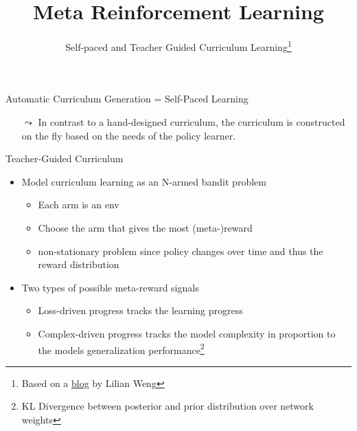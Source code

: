 


\title[Meta-RL]{Meta Reinforcement Learning}
\subtitle{Self-paced and Teacher Guided Curriculum Learning\footnote{Based on a \href{https://lilianweng.github.io/lil-log/2020/01/29/curriculum-for-reinforcement-learning.html}{blog} by Lilian Weng}}



	
	\maketitle

\begin{frame}[c]{Automatic Curriculum Generation = Self-Paced Learning}
	
	\begin{itemize}
		\item[$\leadsto$] In contrast to a hand-designed curriculum, the curriculum is constructed on the fly based on the needs of the policy learner.
	\end{itemize}
	
\end{frame}
\begin{frame}[c]{Teacher-Guided Curriculum }
	
	\begin{itemize}
		\item Model curriculum learning as an N-armed bandit problem
		\begin{itemize}
			\item Each arm is an env 
			\item Choose the arm that gives the most (meta-)reward
			\item non-stationary problem since policy changes over time and thus the reward distribution
		\end{itemize}
		\smallskip
		\item Two types of possible meta-reward signals
		\begin{itemize}
			\item Loss-driven progress tracks the learning progress
			\item Complex-driven progress tracks the model complexity in proportion to the models generalization performance\footnote{KL Divergence between posterior and prior distribution over network weights}
		\end{itemize}
	\end{itemize}
	
\end{frame}
